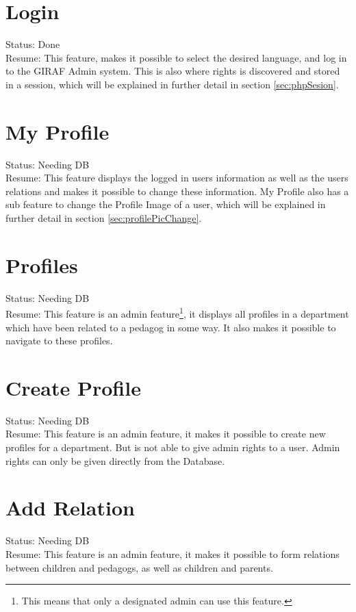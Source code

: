 \section{Login}
Status: Done\\
Resume: This feature, makes it possible to select the desired language, and log in to the GIRAF Admin system. This is also where rights is discovered and stored in a session, which will be explained in further detail in section \vref{sec:phpSesion}.

\section{My Profile}
Status: Needing DB\\
Resume: This feature displays the logged in users information as well as the users relations and makes it possible to change these information. My Profile also has a sub feature to change the Profile Image of a user, which will be explained in further detail in section \vref{sec:profilePicChange}.

\section{Profiles}
Status: Needing DB\\
Resume: This feature is an admin feature\footnote{This means that only a designated admin can use this feature.}, it displays all profiles in a department which have been related to a pedagog in some way. It also makes it possible to navigate to these profiles.

\section{Create Profile}
Status: Needing DB\\
Resume: This feature is an admin feature, it makes it possible to create new profiles for a department. But is not able to give admin rights to a user. Admin rights can only be given directly from the Database.

\section{Add Relation}
Status: Needing DB\\
Resume: This feature is an admin feature, it makes it possible to form relations between children and pedagogs, as well as children and parents.

